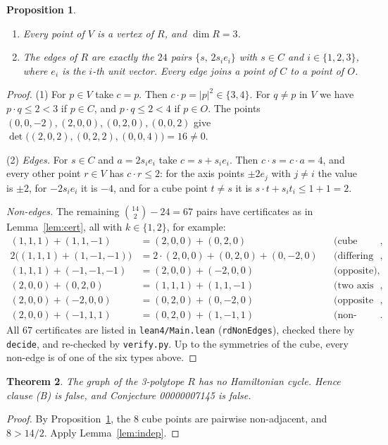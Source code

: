\documentclass[11pt]{article}
\newtheorem{theorem}{Theorem}
\newtheorem{proposition}[theorem]{Proposition}
\theoremstyle{definition}
\theoremstyle{remark}
\begin{document}
\begin{proposition}\label{prop:R}
\begin{enumerate}
\item Every point of $V$ is a vertex of $R$, and $\dim R=3$.
\item The edges of $R$ are exactly the $24$ pairs
$\{s,\,2s_ie_i\}$ with $s\in C$ and $i\in\{1,2,3\}$, where $e_i$ is the $i$-th unit vector. Every edge joins
a point of $C$ to a point of $O$.
\end{enumerate}
\end{proposition}
\begin{proof}
(1) For $p\in V$ take $c=p$. Then $c\cdot p=|p|^2\in\{3,4\}$. For $q\ne p$ in $V$ we
have $p\cdot q\le 2<3$ if $p\in C$, and $p\cdot q\le 2<4$ if $p\in O$. The points
$(0,0,-2),(2,0,0),(0,2,0),(0,0,2)$ give
$\det\bigl((2,0,2),(0,2,2),(0,0,4)\bigr)=16\ne0$.

(2) \emph{Edges.} For $s\in C$ and $a=2s_ie_i$ take $c=s+s_ie_i$. Then
$c\cdot s=c\cdot a=4$, and every other point $r\in V$ has $c\cdot r\le2$: for the
axis points $\pm2e_j$ with $j\ne i$ the value is $\pm2$, for $-2s_ie_i$ it is $-4$,
and for a cube point $t\ne s$ it is $s\cdot t+s_it_i\le1+1=2$.

\emph{Non-edges.} The remaining $\binom{14}{2}-24=67$ pairs have certificates as
in Lemma~\ref{lem:cert}, all with $k\in\{1,2\}$, for example:
\begin{align*}
(1,1,1)+(1,1,-1)&=(2,0,0)+(0,2,0) &&\text{(cube points differing in one sign)},\\
2\bigl((1,1,1)+(1,-1,-1)\bigr)&=2\cdot(2,0,0)+(0,2,0)+(0,-2,0) &&\text{(differing in two signs)},\\
(1,1,1)+(-1,-1,-1)&=(2,0,0)+(-2,0,0) &&\text{(opposite)},\\
(2,0,0)+(0,2,0)&=(1,1,1)+(1,1,-1) &&\text{(two axis points)},\\
(2,0,0)+(-2,0,0)&=(0,2,0)+(0,-2,0) &&\text{(opposite axis points)},\\
(2,0,0)+(-1,1,1)&=(0,2,0)+(1,-1,1) &&\text{(non-incident axis and cube points)}.
\end{align*}
All $67$ certificates are listed in \texttt{lean4/Main.lean} (\texttt{rdNonEdges}),
checked there by \texttt{decide}, and re-checked by \texttt{verify.py}. Up to
the symmetries of the cube, every non-edge is of one of the six types above.
\end{proof}

\begin{theorem}\label{thm:main}
The graph of the 3-polytope $R$ has no Hamiltonian cycle. Hence clause (B) is
false, and Conjecture 00000007145 is false.
\end{theorem}
\begin{proof}
By Proposition~\ref{prop:R}, the $8$ cube points are pairwise non-adjacent, and
$8>14/2$. Apply Lemma~\ref{lem:indep}.
\end{proof}
\end{document}
